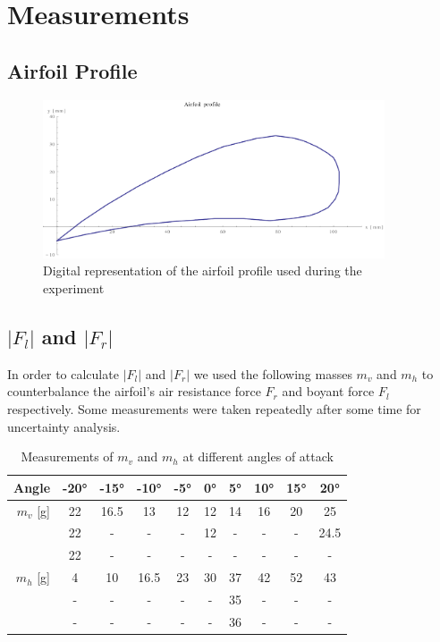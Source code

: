 \documentclass{scrreprt}
\begin{document}
\section{Measurements}

\subsection{Airfoil Profile}

\begin{figure}[H]
	\centering
  \includegraphics[width=0.9\textwidth]{diag/wing_profile.pdf}
	\caption{Digital representation of the airfoil profile used during the experiment}
	\label{fig:profile}
\end{figure}

\subsection{\boldmath$\lvert F_l\rvert$ and \boldmath$\lvert F_r\rvert$}
In order to calculate $\lvert F_l\rvert$ and $\lvert F_r\rvert$ we used the following masses $m_v$ and $m_h$ to counterbalance the airfoil's air resistance force $F_r$ and boyant force $F_l$ respectively. Some measurements were taken repeatedly after some time for uncertainty analysis.

\begin{table}[H]
\center
\begin{tabular}{|r|c|c|c|c|c|c|c|c|c|}
\hline
Angle & \ang{-20} & \ang{-15} & \ang{-10} & \ang{-5} & \ang{0} & \ang{5} & \ang{10} & \ang{15} & \ang{20}\\
\hline\hline
$m_v$ [g] & 22 & 16.5 & 13 & 12 & 12 & 14 & 16 & 20 & 25\\ 
          & 22 &   -   &  -  &  -  & 12 &  -  &  -  &  -  & 24.5\\ 
          & 22 &   -   &  -  &  -  &  -  & -   & -   &  -  & -\\  
\hline\hline
$m_h$ [g] & 4 & 10 & 16.5 & 23 & 30 & 37 & 42 & 52 & 43\\
& - & - & - & - & - & 35 & - & - & -\\
& - & - & - & - & - & 36 & - & - & -\\
\hline
\end{tabular}
\caption{Measurements of $m_v$ and $m_h$ at different angles of attack}
\label{tab:polarmes}
\end{table}
\end{document}
